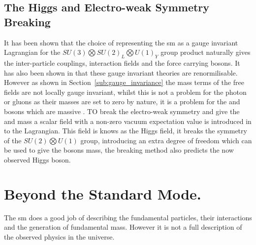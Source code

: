 \subsection{The Higgs and Electro-weak Symmetry Breaking} %
\label{sub:the_higgs_and_electro_weak_symmetry_breaking}
It has been shown that the choice of representing the \ac{sm} as a gauge invariant Lagrangian for the $SU(3)\bigotimes SU(2)_{L} \bigotimes U(1)_{Y}$ group product naturally gives the inter-particle couplings, interaction fields and the force carrying bosons. It has also been shown in \cite{Hooft1971167} that these gauge invariant theories are renormilisable. However as shown in Section~\ref{sub:gauge_invariance} the mass terms of the free fields are not locally gauge invariant, whilst this is not a problem for the photon or gluons as their masses are set to zero by nature, it is a problem for the \PW and \PZ bosons which are massive \cite{Arnison1983103,Aarnio1989539}. TO break the electro-weak symmetry and give the \PW and \PZ mass a scalar field with a non-zero vacuum expectation value is introduced in to the Lagrangian\cite{Higgs:1966cl,Higgs:1964eu}. This field is knows as the Higgs field, it breaks the symmetry of the $SU(2)\bigotimes U(1)$ group, introducing an extra degree of freedom which can be used to give the bosons mass, the breaking method also predicts the now observed\cite{Chatrchyan201230,Aad20121} Higgs boson.













\section{Beyond the Standard Mode.} %
\label{sec:beyond_the_standard_mode_}
The \ac{sm} does a good job of describing the fundamental particles, their interactions and the generation of fundamental mass. However it is not a full description of the observed physics in the universe.

